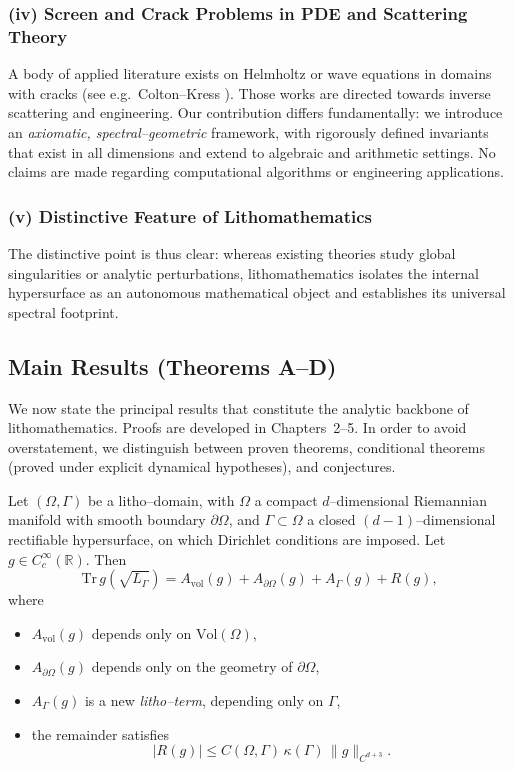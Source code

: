 \subsubsection*{(iv) Screen and Crack Problems in PDE and Scattering Theory}
A body of applied literature exists on Helmholtz or wave equations 
in domains with cracks (see e.g.\ Colton--Kress \cite{Colton92}). 
Those works are directed towards inverse scattering and engineering. 
Our contribution differs fundamentally: we introduce an \emph{axiomatic, 
spectral--geometric} framework, with rigorously defined invariants 
that exist in all dimensions and extend to algebraic and arithmetic settings. 
No claims are made regarding computational algorithms or engineering applications.

\subsubsection*{(v) Distinctive Feature of Lithomathematics}
The distinctive point is thus clear: 
whereas existing theories study global singularities or analytic perturbations, 
lithomathematics isolates the internal hypersurface as an autonomous 
mathematical object and establishes its universal spectral footprint. 

\subsection{Main Results (Theorems A--D)}

We now state the principal results that constitute the analytic backbone 
of lithomathematics. Proofs are developed in Chapters~2--5. 
In order to avoid overstatement, we distinguish between proven theorems, 
conditional theorems (proved under explicit dynamical hypotheses), 
and conjectures.

\begin{theoremA}\label{thm:A}
Let $(\Omega,\Gamma)$ be a litho--domain, with $\Omega$ a compact 
$d$--dimensional Riemannian manifold with smooth boundary $\partial \Omega$, 
and $\Gamma \subset \Omega$ a closed $(d-1)$--dimensional rectifiable hypersurface, 
on which Dirichlet conditions are imposed. 
Let $g \in C_c^\infty(\mathbb{R})$. 
Then
\[
\mathrm{Tr}\, g(\sqrt{L_\Gamma})
 = A_{\mathrm{vol}}(g) + A_{\partial\Omega}(g) + A_\Gamma(g) + R(g),
\]
where
\begin{itemize}
\item $A_{\mathrm{vol}}(g)$ depends only on $\mathrm{Vol}(\Omega)$,
\item $A_{\partial\Omega}(g)$ depends only on the geometry of $\partial\Omega$,
\item $A_\Gamma(g)$ is a new \emph{litho--term}, depending only on $\Gamma$,
\item the remainder satisfies 
\[
|R(g)| \le C(\Omega,\Gamma) \, \kappa(\Gamma) \, \|g\|_{C^{d+3}}.
\]
\end{itemize}
\end{theoremA}

